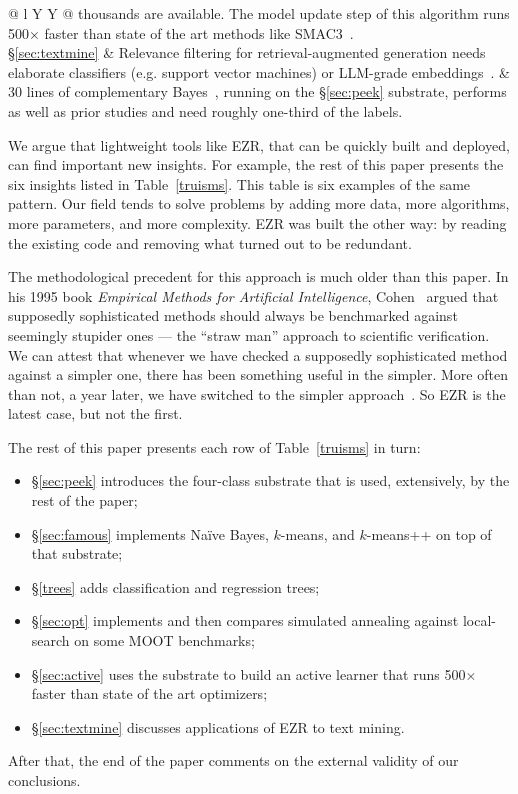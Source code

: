 \documentclass[AMA,STIX2COL]{WileyNJDv5}
\begin{document}
{\begin{table}
{\begin{center}
\begin{tabularx}{\textwidth}{@{} l Y Y @{}}
thousands are available.
The model update step of this algorithm runs  500$\times$ faster than state
of the art methods like
SMAC3~\cite{ganguly2026lowgodatalightse}. \\
\midrule
\S\ref{sec:textmine} &
Relevance filtering for retrieval-augmented generation needs
elaborate classifiers (e.g. support
vector machines) or 
LLM-grade embeddings~\cite{yu2018total,yu2018finding}. &
30 lines of complementary Bayes~\cite{rennie2003tackling},
running on the
\S\ref{sec:peek} substrate,
performs as well as prior studies
and need   roughly
one-third of the labels.\\
\bottomrule
\end{tabularx}
\end{center}}
\end{table}

We argue that lightweight tools
like EZR, that can be quickly built and deployed,  can find important new insights.
For example,
the rest of this paper presents the six insights listed in Table~\ref{truisms}.
This table is six examples
 of the same pattern.   Our field tends to
solve problems by adding more data, more algorithms, more
parameters, and more complexity. EZR was built the other way:
by reading the existing code and removing what
turned out to be redundant.

The methodological precedent for this approach is much older than this paper.
In his 1995 book {\em
Empirical Methods for Artificial Intelligence},
Cohen~\cite{cohen1995empirical} argued that supposedly
sophisticated methods should always be benchmarked against
seemingly stupider ones --- the ``straw man'' approach to
scientific verification. We can attest that whenever we have
checked a supposedly sophisticated method against a simpler one,
there has been something useful in the simpler. More often than
not, a year later, we have switched to the simpler
approach~\cite{Nair17a,agrawal2019dodge,tantithamthavorn2016automated,
fu2016tuning}. So EZR is the latest case, but not the first.
 
The rest of this paper presents each row of
Table~\ref{truisms} in turn:
\begin{itemize}
\item
\S\ref{sec:peek} introduces the four-class substrate that is used, extensively, by the rest of the paper;
\item
\S\ref{sec:famous} implements Naïve Bayes, $k$-means, and
$k$-means++ on top of that substrate;
\item
\S\ref{trees} adds classification and regression trees;
\item 
\S\ref{sec:opt} implements and then compares simulated annealing against
local-search   on some MOOT benchmarks;
\item
\S\ref{sec:active} uses the substrate to build an active learner that runs
500$\times$ faster than   state of the art optimizers;
\item
 \S\ref{sec:textmine} discusses applications of EZR to text mining.
 \end{itemize}
 After that, the end of the paper comments on the external validity of
 our conclusions.   
}
\end{document}
